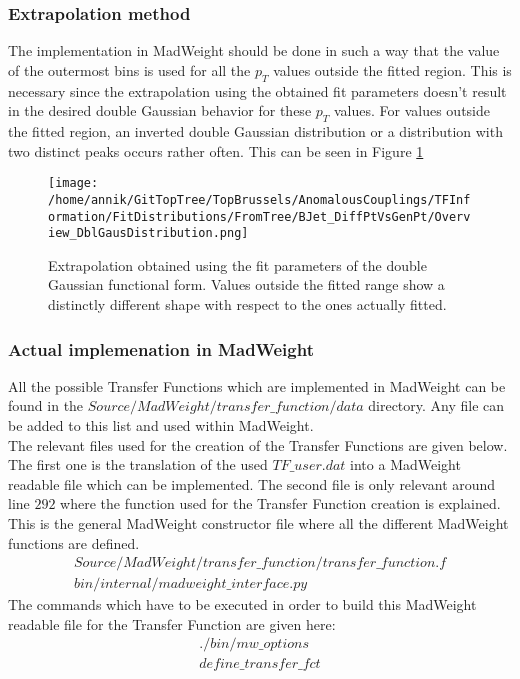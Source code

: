 \subsubsection{Extrapolation method}
The implementation in MadWeight should be done in such a way that the value of the outermost bins is used for all the $p_T$ values outside the fitted region. This is necessary since the extrapolation using the obtained fit parameters doesn't result in the desired double Gaussian behavior for these $p_T$ values. For values outside the fitted region, an inverted double Gaussian distribution or a distribution with two distinct peaks occurs rather often. This can be seen in Figure \ref{fig::doubleGaussExtrap}
\begin{figure}[!h]
  \centering
  \texttt{[image: /home/annik/GitTopTree/TopBrussels/AnomalousCouplings/TFInformation/FitDistributions/FromTree/BJet\_DiffPtVsGenPt/Overview\_DblGausDistribution.png]}
  \caption{Extrapolation obtained using the fit parameters of the double Gaussian functional form. Values outside the fitted range show a distinctly different shape with respect to the ones actually fitted.} \label{fig::doubleGaussExtrap} 
\end{figure}

\subsubsection{Actual implemenation in MadWeight}
All the possible Transfer Functions which are implemented in MadWeight can be found in the $Source/MadWeight/transfer\_function/data$ directory. Any file can be added to this list and used within MadWeight.\\
The relevant files used for the creation of the Transfer Functions are given below. The first one is the translation of the used $TF\_user.dat$ into a MadWeight readable file which can be implemented. The second file is only relevant around line $292$ where the function used for the Transfer Function creation is explained. This is the general MadWeight constructor file where all the different MadWeight functions are defined.
\begin{eqnarray} 
 Source/MadWeight/transfer\_function/transfer\_function.f \nonumber \\
 bin/internal/madweight\_interface.py \nonumber
\end{eqnarray}
The commands which have to be executed in order to build this MadWeight readable file for the Transfer Function are given here:
\begin{eqnarray} 
 ./bin/mw\_options \nonumber \\
 define\_transfer\_fct \nonumber
\end{eqnarray}

